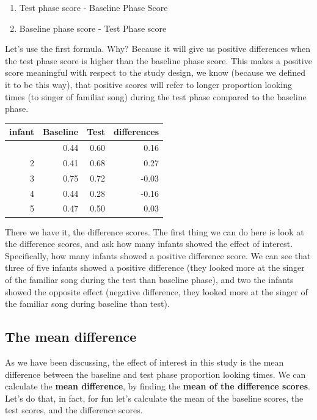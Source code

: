 \documentclass[
  letterpaper,
  DIV=11,
  numbers=noendperiod]{scrreprt}
\providecommand{\tightlist}{%
  \setlength{\itemsep}{0pt}\setlength{\parskip}{0pt}}\usepackage{longtable,booktabs,array}
\begin{document}
\begin{enumerate}
\def\labelenumi{\arabic{enumi}.}
\tightlist
\item
  Test phase score - Baseline Phase Score
\item
  Baseline phase score - Test Phase score
\end{enumerate}

Let's use the first formula. Why? Because it will give us positive
differences when the test phase score is higher than the baseline phase
score. This makes a positive score meaningful with respect to the study
design, we know (because we defined it to be this way), that positive
scores will refer to longer proportion looking times (to singer of
familiar song) during the test phase compared to the baseline phase.

\begin{longtable}[]{@{}rrrr@{}}
\toprule\noalign{}
infant & Baseline & Test & differences \\
\midrule\noalign{}
\endhead
\bottomrule\noalign{}
\endlastfoot
1 & 0.44 & 0.60 & 0.16 \\
2 & 0.41 & 0.68 & 0.27 \\
3 & 0.75 & 0.72 & -0.03 \\
4 & 0.44 & 0.28 & -0.16 \\
5 & 0.47 & 0.50 & 0.03 \\
\end{longtable}

There we have it, the difference scores. The first thing we can do here
is look at the difference scores, and ask how many infants showed the
effect of interest. Specifically, how many infants showed a positive
difference score. We can see that three of five infants showed a
positive difference (they looked more at the singer of the familiar song
during the test than baseline phase), and two the infants showed the
opposite effect (negative difference, they looked more at the singer of
the familiar song during baseline than test).

\subsection{The mean difference}\label{the-mean-difference}

As we have been discussing, the effect of interest in this study is the
mean difference between the baseline and test phase proportion looking
times. We can calculate the \textbf{mean difference}, by finding the
\textbf{mean of the difference scores}. Let's do that, in fact, for fun
let's calculate the mean of the baseline scores, the test scores, and
the difference scores.
\end{document}
